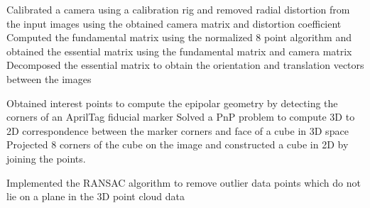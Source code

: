 \resumeItemListStart
\resumeItemDesc
{Calibrated a camera using a calibration rig and removed radial distortion from the input images using the obtained camera matrix and distortion coefficient}
\resumeItemDesc
{Computed the fundamental matrix using the normalized 8 point algorithm and obtained the essential matrix using the fundamental matrix and camera matrix}
\resumeItemDesc
{Decomposed the essential matrix to obtain the orientation and translation vectors between the images}
\resumeItemListEnd

\resumeItemListStart
\resumeItemDesc
{Obtained interest points to compute the epipolar geometry by detecting the corners of an AprilTag fiducial marker}
\resumeItemDesc
{Solved a PnP problem to compute 3D to 2D correspondence between the marker corners and face of a cube in 3D space}
\resumeItemDesc
{Projected 8 corners of the cube on the image and constructed a cube in 2D by joining the points. }
\resumeItemListEnd

\resumeItemListStart
\resumeItemDesc
{Implemented the RANSAC algorithm to remove outlier data points which do not lie on a plane in the 3D point cloud data}
\resumeItemListEnd



